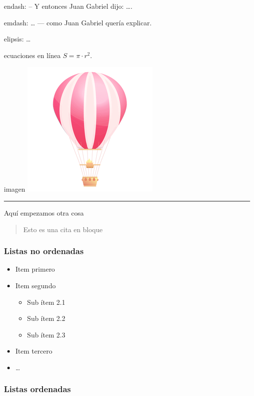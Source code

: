 \documentclass[]{article}
\providecommand{\tightlist}{%
  \setlength{\itemsep}{0pt}\setlength{\parskip}{0pt}}
\begin{document}
endash: -- Y entonces Juan Gabriel dijo: \ldots{}.

emdash: \ldots{} --- como Juan Gabriel quería explicar.

elipsis: \ldots{}

ecuaciones en línea \(S = \pi\cdot r^2\).

imagen \includegraphics{../../teoria/Imgs/logo.png}

\begin{center}\rule{0.5\linewidth}{\linethickness}\end{center}

Aquí empezamos otra cosa

\begin{quote}
Esto es una cita en bloque
\end{quote}

\hypertarget{listas-no-ordenadas}{%
\subsubsection{Listas no ordenadas}\label{listas-no-ordenadas}}

\begin{itemize}
\tightlist
\item
  Item primero
\item
  Item segundo

  \begin{itemize}
  \tightlist
  \item
    Sub ítem 2.1
  \item
    Sub ítem 2.2
  \item
    Sub ítem 2.3
  \end{itemize}
\item
  Item tercero
\item
  \ldots{}
\end{itemize}

\hypertarget{listas-ordenadas}{%
\subsubsection{Listas ordenadas}\label{listas-ordenadas}}
\end{document}
